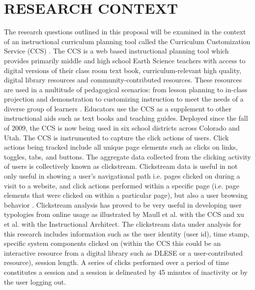 \documentclass{acm_proc_article-sp}
\begin{document}
\section{RESEARCH CONTEXT}
The research questions outlined in this proposal will be examined in the context of an instructional curriculum planning tool called the Curriculum Customization Service (CCS) \cite{sumner:team}. The CCS is a web based instructional planning tool which provides primarily middle and high school Earth Science teachers with access to digital versions of their class room text book, curriculum-relevant high quality, digital library resources and community-contributed resources. These resources are used in a multitude of pedagogical scenarios: from lesson planning to in-class projection and demonstration to customizing instruction to meet the needs of a diverse group of learners \cite{Saldivar:2012}. Educators use the CCS as a supplement to other instructional aids such as text books and teaching guides. Deployed since the fall of 2009, the CCS is now being used in six school districts across Colorado and Utah. The CCS is instrumented to capture the click actions of users. Click actions being tracked include all unique page elements such as clicks on links, toggles, tabs, and buttons. The aggregate data collected from the clicking activity of users is collectively known as clickstream. Clickstream data is useful in not only useful in showing a user's navigational path i.e. pages clicked on during a visit to a website, and click actions performed within a specific page (i.e. page elements that were clicked on within a particular page), but also a user browsing behavior \cite{montgomery2004modeling}. Clickstream analysis has proved to be very useful in developing user typologies from online usage as illustrated by Maull et al. \cite{maullunderstanding} with the CCS and xu et al.\cite{xu} with the Instructional Architect. The clickstream data under analysis for this research includes information such as the user identity (user id), time stamp, specific system components clicked on (within the CCS this could be an interactive resource from a digital library such as DLESE or a user-contributed resource), session length. A series of clicks performed over a period of time constitutes a session and a session is delineated by 45 minutes of inactivity or by the user logging out.
\end{document}
